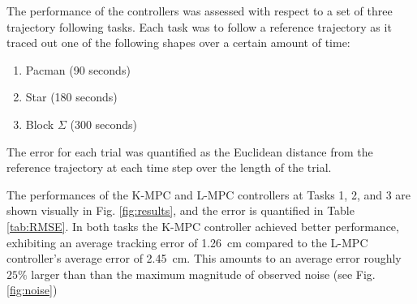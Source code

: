 
The performance of the controllers was assessed with respect to a set of three trajectory following tasks.
Each task was to follow a reference trajectory as it traced out one of the following shapes over a certain amount of time:
\begin{enumerate}
    \item Pacman (90 seconds)
    \item Star (180 seconds)
    \item Block $\Sigma$ (300 seconds)
\end{enumerate}
The error for each trial was quantified as the Euclidean distance from the reference trajectory at each time step over the length of the trial.

The performances of the K-MPC and L-MPC controllers at Tasks 1, 2, and 3 are shown visually in Fig. \ref{fig:results}, and the error is quantified in Table \ref{tab:RMSE}.
In both tasks the K-MPC controller achieved better performance, exhibiting an average tracking error of 1.26~cm compared to the L-MPC controller's average error of 2.45~cm.
This amounts to an average error roughly $25\%$ larger than than the maximum magnitude of observed noise (see Fig. \ref{fig:noise})



